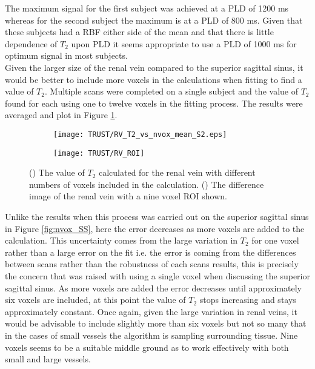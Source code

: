 The maximum signal for the first subject was achieved at a \ac{PLD} of 1200 ms whereas for the second subject the maximum is at a \ac{PLD} of 800 ms. Given that these subjects had a \ac{RBF} either side of the mean and that there is little dependence of $T_2$ upon \ac{PLD} it seems appropriate to use a \ac{PLD} of 1000 ms for optimum signal in most subjects.\\

Given the larger size of the renal vein compared to the superior sagittal sinus, it would be better to include more voxels in the calculations when fitting to find a value of $T_2$. Multiple scans were completed on a single subject and the value of $T_2$ found for each using one to twelve voxels in the fitting process. The results were averaged and plot in Figure \ref{fig:nvox_RV}.\\

\begin{figure}[H]
	\centering
	\begin{subfigure}[c]{0.47\textwidth}
		\centering
		\texttt{[image: TRUST/RV\_T2\_vs\_nvox\_mean\_S2.eps]}
		\caption{}
		\label{fig:nvox_RV}
	\end{subfigure}
	\hfill
	\begin{subfigure}[c]{0.47\textwidth}
		\centering
		\texttt{[image: TRUST/RV\_ROI]}
		\caption{}
		\label{fig:RV_ROI}
	\end{subfigure}
	\caption{() The value of $T_2$ calculated for the renal vein with different numbers of voxels included in the calculation. () The difference image of the renal vein with a nine voxel \ac{ROI} shown.}
	\label{fig:nv_RV}
\end{figure}


Unlike the results when this process was carried out on the superior sagittal sinus in Figure \ref{fig:nvox_SS}, here the error decreases as more voxels are added to the calculation. This uncertainty comes from the large variation in $T_2$ for one voxel rather than a large error on the fit i.e. the error is coming from the differences between scans rather than the robustness of each scans results, this is precisely the concern that was raised with using a single voxel when discussing the superior sagittal sinus. As more voxels are added the error decreases until approximately six voxels are included, at this point the value of $T_2$ stops increasing and stays approximately constant. Once again, given the large variation in renal veins, it would be advisable to include slightly more than six voxels but not so many that in the cases of small vessels the algorithm is sampling surrounding tissue. Nine voxels seems to be a suitable middle ground as to work effectively with both small and large vessels.\\


